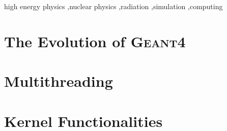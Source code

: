 \documentclass[final,5p,times,longtitle,twocolumn]{elsarticle}
\newcommand{\Gfour}{{\scshape Geant4}}
\begin{document}
\begin{frontmatter}
\author[bs,a]{H. Yoshida}
\address[bs]{Naruto University of Education, Takashima, Naruto-shi, Japan}


\begin{abstract}
\Gfour{} is a software toolkit for the simulation of the passage of particles
through matter.  It is used by a large number of experiments and projects in a
variety of application domains, including high energy physics, astrophysics and
space science, medical physics and radiation protection.  Over the past several
years, major changes have been made to the toolkit in order to accommodate the
needs of these user communities, and to efficiently exploit the growth of 
computing power made available by advances in technology.  The adaptation of 
\Gfour{} to multithreading, advances in physics, detector modeling and 
visualization, extensions to the toolkit, including biasing and reverse Monte
Carlo, and tools for physics and release validation are discussed here.
\end{abstract}

\begin{keyword}
high energy physics \sep nuclear physics \sep radiation \sep simulation \sep computing 


\end{keyword}

\end{frontmatter}


\section{The Evolution of \Gfour{}}



\section{Multithreading}



\section{Kernel Functionalities}
\end{document}
